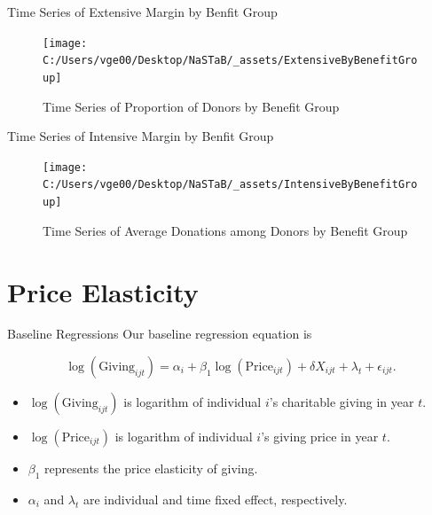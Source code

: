 \documentclass[
  ignorenonframetext,
]{beamer}
\providecommand{\tightlist}{%
  \setlength{\itemsep}{0pt}\setlength{\parskip}{0pt}}
\begin{document}
\begin{frame}{Time Series of Extensive Margin by Benfit Group}
\protect\hypertarget{time-series-of-extensive-margin-by-benfit-group}{}
\begin{figure}
\texttt{[image: C:/Users/vge00/Desktop/NaSTaB/\_assets/ExtensiveByBenefitGroup]} \caption{Time Series of Proportion of Donors by Benefit Group}\label{fig:unnamed-chunk-4}
\end{figure}
\end{frame}

\begin{frame}{Time Series of Intensive Margin by Benfit Group}
\protect\hypertarget{time-series-of-intensive-margin-by-benfit-group}{}
\begin{figure}
\texttt{[image: C:/Users/vge00/Desktop/NaSTaB/\_assets/IntensiveByBenefitGroup]} \caption{Time Series of Average Donations among Donors by Benefit Group}\label{fig:unnamed-chunk-5}
\end{figure}
\end{frame}

\hypertarget{price-elasticity}{%
\section{Price Elasticity}\label{price-elasticity}}

\begin{frame}{Baseline Regressions}
\protect\hypertarget{baseline-regressions}{}
Our baseline regression equation is

\[
    \log(\text{Giving}_{ijt}) = 
    \alpha_i + \beta_1 \log(\text{Price}_{ijt}) + \delta X_{ijt} + \lambda_t + \epsilon_{ijt}.
\]

\begin{itemize}
\tightlist
\item
  \(\log(\text{Giving}_{ijt})\) is logarithm of individual \(i\)'s
  charitable giving in year \(t\).
\item
  \(\log(\text{Price}_{ijt})\) is logarithm of individual \(i\)'s giving
  price in year \(t\).
\item
  \(\beta_1\) represents the price elasticity of giving.
\item
  \(\alpha_i\) and \(\lambda_t\) are individual and time fixed effect,
  respectively.
\end{itemize}
\end{frame}
\end{document}
